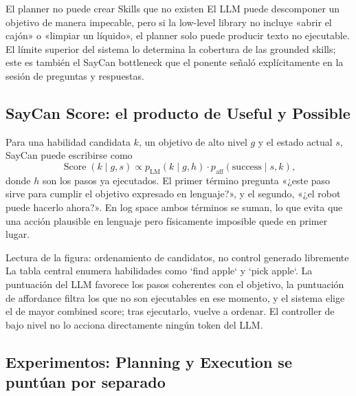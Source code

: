 \begin{warningbox}{El planner no puede crear Skills que no existen}
El LLM puede descomponer un objetivo de manera impecable, pero si la low-level library no incluye «abrir el cajón» o «limpiar un líquido», el planner solo puede producir texto no ejecutable. El límite superior del sistema lo determina la cobertura de las grounded skills; este es también el SayCan bottleneck que el ponente señaló explícitamente en la sesión de preguntas y respuestas.
\end{warningbox}

\subsection{SayCan Score: el producto de Useful y Possible}

Para una habilidad candidata $k$, un objetivo de alto nivel $g$ y el estado actual $s$, SayCan puede escribirse como
\begin{equation}
\operatorname{Score}(k\mid g,s)
\propto p_{\mathrm{LM}}(k\mid g,h)
\cdot p_{\mathrm{aff}}(\mathrm{success}\mid s,k),
\end{equation}
donde $h$ son los pasos ya ejecutados. El primer término pregunta «¿este paso sirve para cumplir el objetivo expresado en lenguaje?», y el segundo, «¿el robot puede hacerlo ahora?». En log space ambos términos se suman, lo que evita que una acción plausible en lenguaje pero físicamente imposible quede en primer lugar.


\begin{knowledgebox}{Lectura de la figura: ordenamiento de candidatos, no control generado libremente}
La tabla central enumera habilidades como `find apple` y `pick apple`. La puntuación del LLM favorece los pasos coherentes con el objetivo, la puntuación de affordance filtra los que no son ejecutables en ese momento, y el sistema elige el de mayor combined score; tras ejecutarlo, vuelve a ordenar. El controller de bajo nivel no lo acciona directamente ningún token del LLM.
\end{knowledgebox}

\subsection{Experimentos: Planning y Execution se puntúan por separado}

